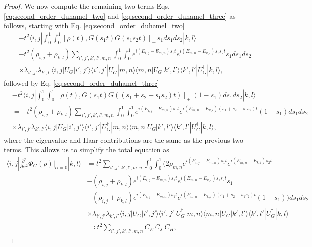 \documentclass{article}
\newcommand{\ket}[1]{|#1\rangle}
\newcommand{\bra}[1]{\langle #1|}
\begin{document}
\begin{proof}
We now compute the remaining two terms Eqs. \eqref{eq:second_order_duhamel_two} and \eqref{eq:second_order_duhamel_three} as follows, starting with Eq. \eqref{eq:second_order_duhamel_two}
\begin{align}
    &-t^2 \bra{i,j} \int_0^1 \int_0^1 [\rho(t), G(s_1 t) G(s_1 s_2 t)]_+ ~s_1 ds_1 ds_2 \ket{k,l} \\
    =& -t^2 (\rho_{i,j} + \rho_{k,l}) \sum_{i',j',k',l',m,n} \int_0^1 \int_0^1 e^{i(E_{i,j} - E_{m,n})s_1 t} e^{i(E_{m,n} - E_{k,l})s_1 s_2 t} s_1 ds_1 ds_2 \\
    &\times \lambda_{i',j'} \lambda_{k',l'} \bra{i,j} U_G \ket{i',j'} \bra{i',j'} U_G^\dagger \ket{m,n} \bra{m,n} U_G \ket{k',l'} \bra{k',l'} U_G^\dagger \ket{k,l},
\end{align}
followed by Eq. \eqref{eq:second_order_duhamel_three}
\begin{align}
    &-t^2 \bra{i,j} \int_0^1 \int_0^1 [\rho(t), G(s_1 t) G((s_1 + s_2 - s_1 s_2) t)]_+ ~ (1- s_1) ds_1 ds_2 \ket{k,l} \\
    &= -t^2 (\rho_{i,j} + \rho_{k,l}) \sum_{i',j',k',l',m,n} \int_0^1 \int_0^1 e^{i(E_{i,j} - E_{m,n})s_1 t} e^{i(E_{m,n} - E_{k,l})(s_1 + s_2 - s_1 s_2)t} (1-s_1)ds_1 ds_2 \\
    &\times \lambda_{i',j'} \lambda_{k',l'} \bra{i,j} U_G \ket{i',j'} \bra{i',j'} U_G^\dagger \ket{m,n} \bra{m,n} U_G \ket{k',l'} \bra{k',l'} U_G^\dagger \ket{k,l},
\end{align}
where the eigenvalue and Haar contributions are the same as the previous two terms. This allows us to simplify the total equation as
\begin{align}
    \bra{i,j} \frac{\partial^2}{\partial \alpha^2} \Phi_G(\rho) \bigg|_{\alpha = 0} \ket{k,l} &= t^2 \sum_{i',j',k',l',m,n} \int_0^1 \int_0^1 \bigg(  2 \rho_{m,n} e^{i(E_{i,j} - E_{m,n})s_1t} e^{i(E_{m,n} - E_{k,l})s_2 t}  \\
    &- (\rho_{i,j} + \rho_{k,l}) e^{i(E_{i,j} - E_{m,n})s_1 t} e^{i(E_{m,n} - E_{k,l})s_1 s_2 t} s_1 \\
    &- (\rho_{i,j} + \rho_{k,l}) e^{i(E_{i,j} - E_{m,n})s_1 t} e^{i(E_{m,n} - E_{k,l})(s_1 + s_2 - s_1 s_2)t} (1-s_1) \bigg) ds_1 ds_2 \\
    &\times \lambda_{i',j'} \lambda_{k',l'} \bra{i,j} U_G \ket{i',j'} \bra{i',j'} U_G^\dagger \ket{m,n} \bra{m,n} U_G \ket{k',l'} \bra{k',l'} U_G^\dagger \ket{k,l} \\
    &\eqqcolon t^2 \sum_{i',j',k',l',m,n} C_{E} ~ C_{\lambda} ~ C_{H},
\end{align}

\end{proof}
\end{document}
